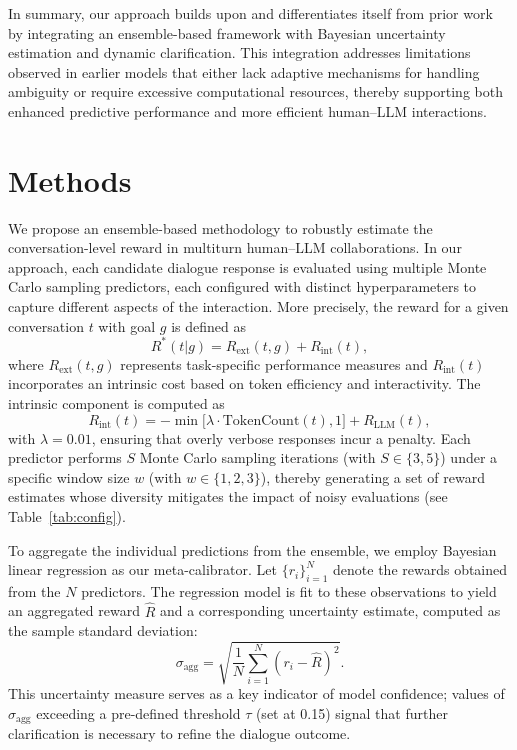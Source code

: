 \documentclass{article}
\begin{document}
In summary, our approach builds upon and differentiates itself from prior work by integrating an ensemble-based framework with Bayesian uncertainty estimation and dynamic clarification. This integration addresses limitations observed in earlier models that either lack adaptive mechanisms for handling ambiguity or require excessive computational resources, thereby supporting both enhanced predictive performance and more efficient human–LLM interactions.

\section{Methods}
We propose an ensemble-based methodology to robustly estimate the conversation-level reward in multiturn human–LLM collaborations. In our approach, each candidate dialogue response is evaluated using multiple Monte Carlo sampling predictors, each configured with distinct hyperparameters to capture different aspects of the interaction. More precisely, the reward for a given conversation \( t \) with goal \( g \) is defined as
\[
R^*(t|g) = R_{\text{ext}}(t,g) + R_{\text{int}}(t),
\]
where \( R_{\text{ext}}(t,g) \) represents task-specific performance measures and \( R_{\text{int}}(t) \) incorporates an intrinsic cost based on token efficiency and interactivity. The intrinsic component is computed as
\[
R_{\text{int}}(t) = -\min\bigl[\lambda \cdot \mathrm{TokenCount}(t), 1\bigr] + R_{\text{LLM}}(t),
\]
with \(\lambda = 0.01\), ensuring that overly verbose responses incur a penalty. Each predictor performs \( S \) Monte Carlo sampling iterations (with \( S \in \{3,5\} \)) under a specific window size \( w \) (with \( w \in \{1,2,3\} \)), thereby generating a set of reward estimates whose diversity mitigates the impact of noisy evaluations (see Table~\ref{tab:config}).

To aggregate the individual predictions from the ensemble, we employ Bayesian linear regression as our meta-calibrator. Let \(\{r_i\}_{i=1}^N\) denote the rewards obtained from the \(N\) predictors. The regression model is fit to these observations to yield an aggregated reward \(\hat{R}\) and a corresponding uncertainty estimate, computed as the sample standard deviation:
\[
\sigma_{\text{agg}} = \sqrt{\frac{1}{N}\sum_{i=1}^N (r_i - \hat{R})^2}.
\]
This uncertainty measure serves as a key indicator of model confidence; values of \(\sigma_{\text{agg}}\) exceeding a pre-defined threshold \(\tau\) (set at 0.15) signal that further clarification is necessary to refine the dialogue outcome.
\end{document}
